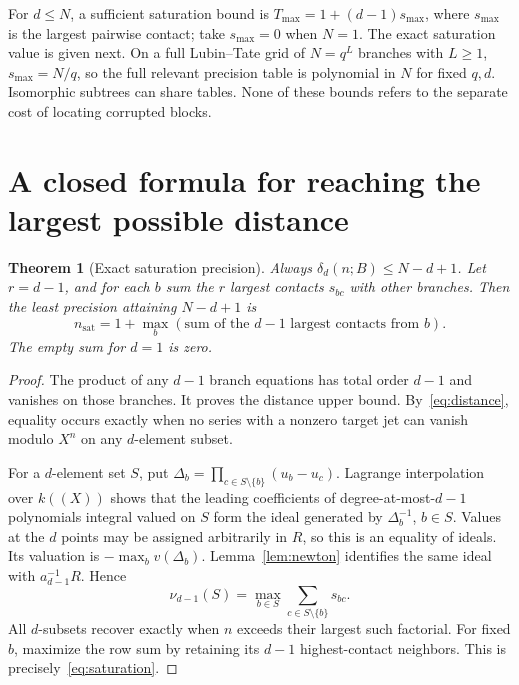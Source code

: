\documentclass[11pt]{article}
\newtheorem{theorem}{Theorem}[section]
\theoremstyle{definition}
\begin{document}
For $d\le N$, a sufficient saturation bound is $T_{\max}=1+(d-1)s_{\max}$, where $s_{\max}$ is the largest pairwise contact; take $s_{\max}=0$ when $N=1$. The exact saturation value is given next. On a full Lubin--Tate grid of $N=q^L$ branches with $L\ge1$, $s_{\max}=N/q$, so the full relevant precision table is polynomial in $N$ for fixed $q,d$. Isomorphic subtrees can share tables. None of these bounds refers to the separate cost of locating corrupted blocks.

\section{A closed formula for reaching the largest possible distance}\label{sec:saturation}

\begin{theorem}[Exact saturation precision]\label{thm:saturation}
Always $\delta_d(n;B)\le N-d+1$. Let $r=d-1$, and for each $b$ sum the $r$ largest contacts $s_{bc}$ with other branches. Then the least precision attaining $N-d+1$ is
\begin{equation}\label{eq:saturation}
 \boxed{\displaystyle n_{\mathrm{sat}}=
 1+\max_b\left(\text{sum of the $d-1$ largest contacts from $b$}\right).}
\end{equation}
The empty sum for $d=1$ is zero.
\end{theorem}

\begin{proof}
The product of any $d-1$ branch equations has total order $d-1$ and vanishes on those branches. It proves the distance upper bound. By~\eqref{eq:distance}, equality occurs exactly when no series with a nonzero target jet can vanish modulo $X^n$ on any $d$-element subset.

For a $d$-element set $S$, put $\Delta_b=\prod_{c\in S\setminus\{b\}}(u_b-u_c)$. Lagrange interpolation over $k((X))$ shows that the leading coefficients of degree-at-most-$d-1$ polynomials integral valued on $S$ form the ideal generated by $\Delta_b^{-1}$, $b\in S$. Values at the $d$ points may be assigned arbitrarily in $R$, so this is an equality of ideals. Its valuation is $-\max_b v(\Delta_b)$. Lemma~\ref{lem:newton} identifies the same ideal with $a_{d-1}^{-1}R$. Hence
\begin{equation}\label{eq:lastfactorial}
 \nu_{d-1}(S)=\max_{b\in S}\sum_{c\in S\setminus\{b\}}s_{bc}.
\end{equation}
All $d$-subsets recover exactly when $n$ exceeds their largest such factorial. For fixed $b$, maximize the row sum by retaining its $d-1$ highest-contact neighbors. This is precisely~\eqref{eq:saturation}.
\end{proof}
\end{document}
